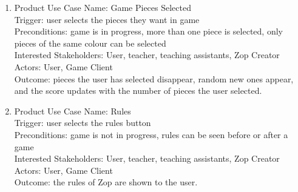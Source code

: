 \documentclass[12pt]{article}
\begin{document}
\begin{enumerate}
 \item Product Use Case Name: Game Pieces Selected\\
 Trigger: user selects the pieces they want in game\\
 Preconditions: game is in progress, more than one piece is selected, only pieces of the same colour can be selected\\
 Interested Stakeholders: User, teacher, teaching assistants, Zop Creator\\
 Actors: User, Game Client\\
 Outcome: pieces the user has selected disappear, random new ones appear, and the score updates with the number of pieces the user selected.\\
 
 \item Product Use Case Name: Rules\\
 Trigger: user selects the rules button\\
 Preconditions: game is not in progress, rules can be seen before or after a game\\
 Interested Stakeholders: User, teacher, teaching assistants, Zop Creator\\
 Actors: User, Game Client\\
 Outcome: the rules of Zop are shown to the user.\\

\end{enumerate}
\end{document}
